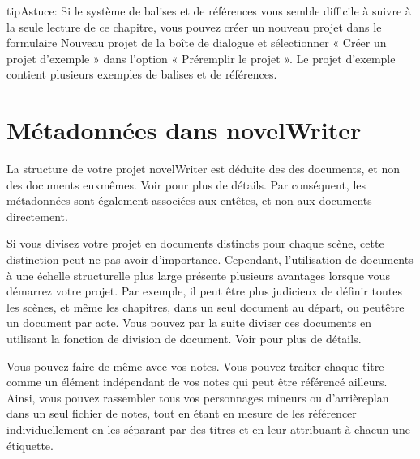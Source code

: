 \documentclass[a4paper,11pt,french]{sphinxmanual}
\begin{document}
\begin{sphinxadmonition}{tip}{Astuce:}
\sphinxAtStartPar
Si le système de balises et de références vous semble difficile à suivre à la seule lecture de ce chapitre, vous pouvez créer un nouveau projet dans le formulaire Nouveau projet de la boîte de dialogue  et sélectionner « Créer un projet d’exemple » dans l’option « Pré\sphinxhyphen{}remplir le projet ». Le projet d’exemple contient plusieurs exemples de balises et de références.
\end{sphinxadmonition}


\section{Métadonnées dans novelWriter}
\label{\detokenize{project_references:metadata-in-novelwriter}}\label{\detokenize{project_references:a-references-metadata}}
\sphinxAtStartPar
La structure de votre projet novelWriter est déduite des {\hyperref[\detokenize{int_glossary:term-Headings}]{}} des documents, et non des documents eux\sphinxhyphen{}mêmes. Voir {\hyperref[\detokenize{project_structure:a-struct-heads}]{}} pour plus de détails. Par conséquent, les métadonnées sont également associées aux en\sphinxhyphen{}têtes, et non aux documents directement.

\sphinxAtStartPar
Si vous divisez votre projet en documents distincts pour chaque scène, cette distinction peut ne pas avoir d’importance. Cependant, l’utilisation de documents à une échelle structurelle plus large présente plusieurs avantages lorsque vous démarrez votre projet. Par exemple, il peut être plus judicieux de définir toutes les scènes, et même les chapitres, dans un seul document au départ, ou peut\sphinxhyphen{}être un document par acte. Vous pouvez par la suite diviser ces documents en utilisant la fonction de division de document. Voir {\hyperref[\detokenize{usage_project:a-ui-tree-split-merge}]{}} pour plus de détails.

\sphinxAtStartPar
Vous pouvez faire de même avec vos notes. Vous pouvez traiter chaque titre comme un élément indépendant de vos notes qui peut être référencé ailleurs. Ainsi, vous pouvez rassembler tous vos personnages mineurs ou d’arrière\sphinxhyphen{}plan dans un seul fichier de notes, tout en étant en mesure de les référencer individuellement en les séparant par des titres et en leur attribuant à chacun une étiquette.
\end{document}
